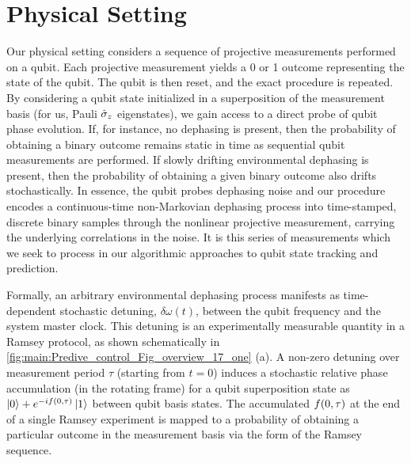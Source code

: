 \section{Physical Setting \label{sec:main:PhysicalSetting}}  
\label{sec:main:1} 

Our physical setting considers a sequence of projective measurements performed on a qubit. Each projective measurement yields a 0 or 1 outcome representing the state of the qubit. The qubit is then reset, and the exact procedure is repeated. By considering a qubit state initialized in a superposition of the measurement basis (for us, Pauli $\hat{\sigma}_{z}$ eigenstates), we gain access to a direct probe of qubit phase evolution.  If, for instance, no dephasing is present, then the probability of obtaining a binary outcome remains static in time as sequential qubit measurements are performed. If slowly drifting environmental dephasing is present, then the probability of obtaining a given binary outcome also drifts stochastically. In essence, the qubit probes dephasing noise and our procedure encodes a continuous-time non-Markovian dephasing process into time-stamped, discrete binary samples through the nonlinear projective measurement, carrying the underlying correlations in the noise.  It is this series of measurements which we seek to process in our algorithmic approaches to qubit state tracking and prediction. 

Formally, an arbitrary environmental dephasing process manifests as time-dependent stochastic detuning, $\delta \omega (t)$, between the qubit frequency and the system master clock. This detuning is an experimentally measurable quantity in a Ramsey protocol, as shown schematically in \cref{fig:main:Predive_control_Fig_overview_17_one} (a). A non-zero detuning over measurement period $\tau$ (starting from $t=0$) induces a stochastic relative phase accumulation (in the rotating frame) for a qubit superposition state as $\left|0\right\rangle+e^{-if(0, \tau)}\left|1\right\rangle$ between qubit basis states.  The accumulated $f(0, \tau)$ at the end of a single Ramsey experiment is mapped to a probability of obtaining a particular outcome in the measurement basis via the form of the Ramsey sequence.  

